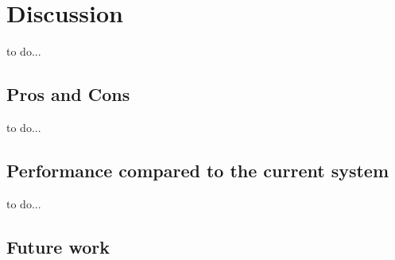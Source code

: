 \section{Discussion}
\label{S:6}

\begin{notation}
    to do... \\
\end{notation}

\subsection{Pros and Cons}

\begin{notation}
    to do... \\
\end{notation}

\subsection{Performance compared to the current system}

\begin{notation}
    to do... \\
\end{notation}

\subsection{Future work}